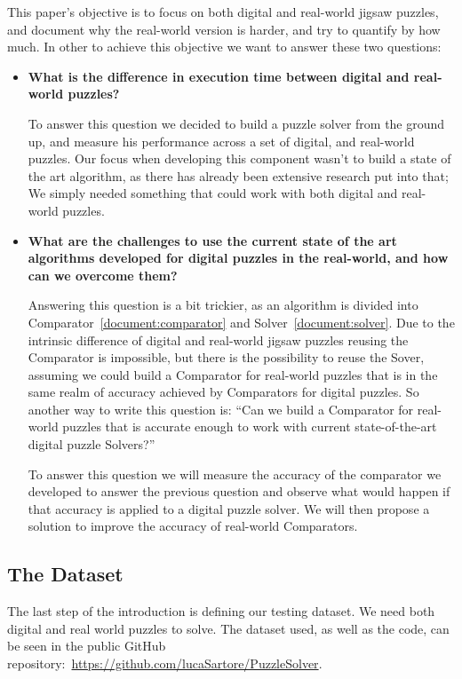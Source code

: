 \documentclass{article}
\begin{document}
This paper’s objective is to focus on both digital and real-world jigsaw puzzles,
and document why the real-world version is harder, and try to quantify by how much.
In other to achieve this objective we want to answer these two questions:
\begin{itemize}
  \item \textbf{What is the difference in execution time between
                digital and real-world puzzles?}
  
  To answer this question we decided to build a puzzle solver from the ground up,
  and measure his performance across a set of digital, and real-world puzzles.
  Our focus when developing this component wasn't to build a state of the art algorithm,
  as there has already been extensive research put into that;
  We simply needed something that could work with both digital and real-world puzzles.
  
  \item \textbf{What are the challenges to use the current state of the art algorithms developed for digital
                puzzles in the real-world, and how can we overcome them?}
  
	Answering this question is a bit trickier, as an algorithm is divided into Comparator~\cref{document:comparator}
  and Solver~\cref{document:solver}. Due to the intrinsic difference of digital and real-world jigsaw puzzles
  reusing the Comparator is impossible, but there is the possibility to reuse the Sover,
  assuming we could build a Comparator for real-world puzzles that is in the same realm
  of accuracy achieved by Comparators for digital puzzles.
  So another way to write this question is: ``Can we build a Comparator for real-world
  puzzles that is accurate enough to work with current state-of-the-art  digital
  puzzle Solvers?''

	To answer this question we will measure the accuracy of the comparator we developed
  to answer the previous question and observe what would happen if that accuracy is
  applied to a digital puzzle solver. We will then propose a solution to improve
  the accuracy of real-world Comparators.


\end{itemize}

\subsection{The Dataset}
The last step of the introduction is defining our
testing dataset. We need both digital and real world
puzzles to solve. The dataset used, as well as
the code, can be seen in the public GitHub
repository:~\url{https://github.com/lucaSartore/PuzzleSolver}.
\label{document:dataset}
\end{document}
